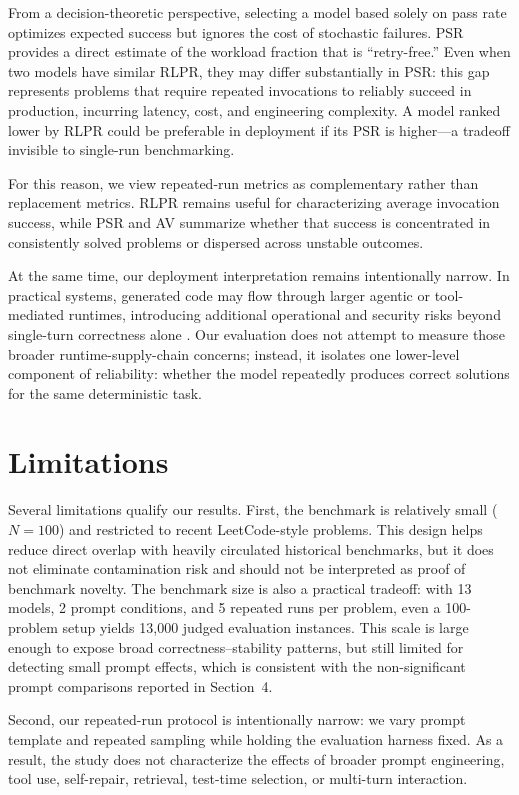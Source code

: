 \documentclass[11pt]{article}
\begin{document}
From a decision-theoretic perspective, selecting a model based solely on pass rate optimizes expected success but ignores the cost of stochastic failures. PSR provides a direct estimate of the workload fraction that is ``retry-free.'' Even when two models have similar RLPR, they may differ substantially in PSR: this gap represents problems that require repeated invocations to reliably succeed in production, incurring latency, cost, and engineering complexity. A model ranked lower by RLPR could be preferable in deployment if its PSR is higher---a tradeoff invisible to single-run benchmarking.

For this reason, we view repeated-run metrics as complementary rather than replacement metrics. RLPR remains useful for characterizing average invocation success, while PSR and AV summarize whether that success is concentrated in consistently solved problems or dispersed across unstable outcomes.

At the same time, our deployment interpretation remains intentionally narrow. In practical systems, generated code may flow through larger agentic or tool-mediated runtimes, introducing additional operational and security risks beyond single-turn correctness alone \cite{jiang2026agenticaicybersecurityattack}. Our evaluation does not attempt to measure those broader runtime-supply-chain concerns; instead, it isolates one lower-level component of reliability: whether the model repeatedly produces correct solutions for the same deterministic task.

\section{Limitations}

Several limitations qualify our results. First, the benchmark is relatively small ($N=100$) and restricted to recent LeetCode-style problems. This design helps reduce direct overlap with heavily circulated historical benchmarks, but it does not eliminate contamination risk and should not be interpreted as proof of benchmark novelty. The benchmark size is also a practical tradeoff: with 13 models, 2 prompt conditions, and 5 repeated runs per problem, even a 100-problem setup yields 13{,}000 judged evaluation instances. This scale is large enough to expose broad correctness--stability patterns, but still limited for detecting small prompt effects, which is consistent with the non-significant prompt comparisons reported in Section~4.

Second, our repeated-run protocol is intentionally narrow: we vary prompt template and repeated sampling while holding the evaluation harness fixed. As a result, the study does not characterize the effects of broader prompt engineering, tool use, self-repair, retrieval, test-time selection, or multi-turn interaction.
\end{document}
